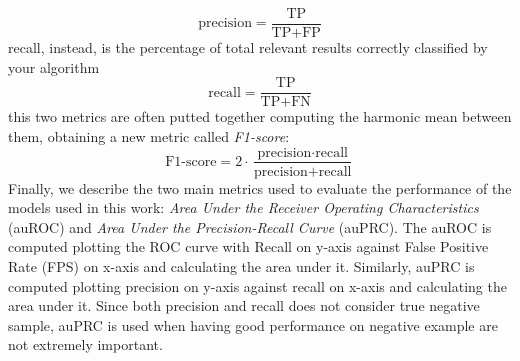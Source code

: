 \begin{equation}
    \textrm{precision} = \frac{\textrm{TP}}{\textrm{TP}+\textrm{FP}}
\end{equation}
recall, instead, is the percentage of total relevant results correctly classified by your algorithm 
\begin{equation}
    \textrm{recall} = \frac{\textrm{TP}}{\textrm{TP}+\textrm{FN}}
\end{equation}
this two metrics are often putted together computing the harmonic mean between them, obtaining a new metric called \emph{F1-score}:
\begin{equation}
    \textrm{F1-score} = 2 \cdot \frac{\textrm{precision} \cdot \textrm{recall}}{\textrm{precision}+\textrm{recall}}
\end{equation}
Finally, we describe the two main metrics used to evaluate the performance of the models used in this work: \emph{Area Under the Receiver Operating Characteristics} (auROC) and \emph{Area Under the Precision-Recall Curve} (auPRC). 
The auROC is computed plotting the ROC curve with Recall on y-axis against False Positive Rate (FPS) on x-axis and calculating the area under it.  Similarly, auPRC is computed plotting precision on y-axis against recall on x-axis and calculating the area under it. Since both precision and recall does not consider true negative sample, auPRC is used when having good performance on negative example are not extremely important. 